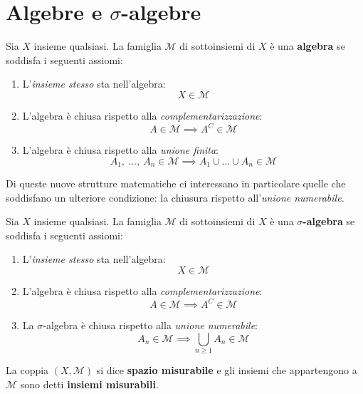 \section{Algebre e $\sigma$-algebre}
\begin{define}[Algebra]
	Sia $X$ insieme qualsiasi. La famiglia $\mathcal{M}$ di sottoinsiemi di $X$ è una \textbf{algebra}  se soddisfa i seguenti assiomi:
	\begin{enumerate}
		\item L'\textit{insieme stesso} sta nell'algebra:
		\begin{equation}
			X\in\mathcal{M}
		\end{equation}
		\item L'algebra è chiusa rispetto alla \textit{complementarizzazione}: \begin{equation}
			A\in\mathcal{M}\implies A^C\in\mathcal{M}
		\end{equation}
		\item L'algebra è chiusa rispetto alla \textit{unione finita}:
		\begin{equation}
			A_1,\ \ldots,\ A_n\in\mathcal{M}\implies A_1\cup\ldots\cup A_n\in\mathcal{M}
		\end{equation}
	\end{enumerate}
\end{define}
Di queste nuove strutture matematiche ci interessano in particolare quelle che soddisfano un ulteriore condizione: la chiusura rispetto all'\textit{unione numerabile}.
\begin{define}
	Sia $X$ insieme qualsiasi. La famiglia $\mathcal{M}$ di sottoinsiemi di $X$ è una $\sigma$\textbf{-algebra}  se soddisfa i seguenti assiomi:
	\begin{enumerate}
		\item L'\textit{insieme stesso} sta nell'algebra:
		\begin{equation}
			X\in\mathcal{M}
		\end{equation}
		\item L'algebra è chiusa rispetto alla \textit{complementarizzazione}: \begin{equation}
			A\in\mathcal{M}\implies A^C\in\mathcal{M}
		\end{equation}
		\item La $\sigma$-algebra è chiusa rispetto alla \textit{unione numerabile}: \begin{equation}
			A_n\in\mathcal{M}\implies \bigcup_{n\geq 1}A_n\in\mathcal{M} 
		\end{equation}
	\end{enumerate}
La coppia $\left(X,\mathcal{M}\right)$ si dice \textbf{spazio misurabile} e gli insiemi che appartengono a $\mathcal{M}$ sono detti \textbf{insiemi misurabili}.
\end{define}
